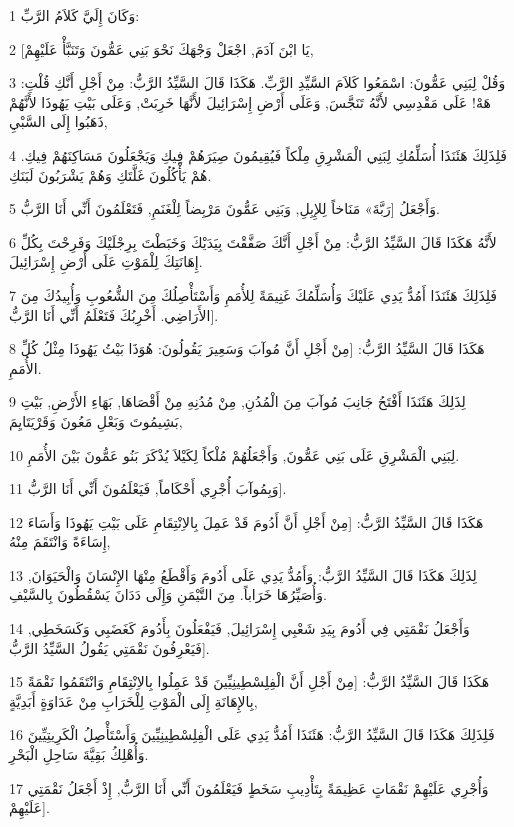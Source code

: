 \par 1 وَكَانَ إِلَيَّ كَلاَمُ الرَّبِّ:
\par 2 [يَا ابْنَ آدَمَ, اجْعَلْ وَجْهَكَ نَحْوَ بَنِي عَمُّونَ وَتَنَبَّأْ عَلَيْهِمْ,
\par 3 وَقُلْ لِبَنِي عَمُّونَ: اسْمَعُوا كَلاَمَ السَّيِّدِ الرَّبِّ. هَكَذَا قَالَ السَّيِّدُ الرَّبُّ: مِنْ أَجْلِ أَنَّكِ قُلْتِ: هَهْ! عَلَى مَقْدِسِي لأَنَّهُ تَنَجَّسَ, وَعَلَى أَرْضِ إِسْرَائِيلَ لأَنَّهَا خَرِبَتْ, وَعَلَى بَيْتِ يَهُوذَا لأَنَّهُمْ ذَهَبُوا إِلَى السَّبْيِ,
\par 4 فَلِذَلِكَ هَئَنَذَا أُسَلِّمُكِ لِبَنِي الْمَشْرِقِ مِلْكاً فَيُقِيمُونَ صِيَرَهُمْ فِيكِ وَيَجْعَلُونَ مَسَاكِنَهُمْ فِيكِ. هُمْ يَأْكُلُونَ غَلَّتَكِ وَهُمْ يَشْرَبُونَ لَبَنَكِ.
\par 5 وَأَجْعَلُ [رَبَّةَ» مَنَاخاً لِلإِبِلِ, وَبَنِي عَمُّونَ مَرْبِضاً لِلْغَنَمِ, فَتَعْلَمُونَ أَنِّي أَنَا الرَّبُّ.
\par 6 لأَنَّهُ هَكَذَا قَالَ السَّيِّدُ الرَّبُّ: مِنْ أَجْلِ أَنَّكَ صَفَّقْتَ بِيَدَيْكَ وَخَبَطْتَ بِرِجْلَيْكَ وَفَرِحْتَ بِكُلِّ إِهَانَتِكَ لِلْمَوْتِ عَلَى أَرْضِ إِسْرَائِيلَ.
\par 7 فَلِذَلِكَ هَئَنَذَا أَمُدُّ يَدِي عَلَيْكَ وَأُسَلِّمُكَ غَنِيمَةً لِلأُمَمِ وَأَسْتَأْصِلُكَ مِنَ الشُّعُوبِ وَأُبِيدُكَ مِنَ الأَرَاضِي. أَخْرِبُكَ فَتَعْلَمُ أَنِّي أَنَا الرَّبُّ].
\par 8 هَكَذَا قَالَ السَّيِّدُ الرَّبُّ: [مِنْ أَجْلِ أَنَّ مُوآبَ وَسَعِيرَ يَقُولُونَ: هُوَذَا بَيْتُ يَهُوذَا مِثْلُ كُلِّ الأُمَمِ.
\par 9 لِذَلِكَ هَئَنَذَا أَفْتَحُ جَانِبَ مُوآبَ مِنَ الْمُدُنِ, مِنْ مُدُنِهِ مِنْ أَقْصَاهَا, بَهَاءِ الأَرْضِ, بَيْتِ بَشِيمُوتَ وَبَعْلِ مَعُونَ وَقَرْيَتَايِمَ,
\par 10 لِبَنِي الْمَشْرِقِ عَلَى بَنِي عَمُّونَ, وَأَجْعَلُهُمْ مُلْكاً لِكَيْلاَ يُذْكَرَ بَنُو عَمُّونَ بَيْنَ الأُمَمِ.
\par 11 وَبِمُوآبَ أُجْرِي أَحْكَاماً, فَيَعْلَمُونَ أَنِّي أَنَا الرَّبُّ].
\par 12 هَكَذَا قَالَ السَّيِّدُ الرَّبُّ: [مِنْ أَجْلِ أَنَّ أَدُومَ قَدْ عَمِلَ بِالاِنْتِقَامِ عَلَى بَيْتِ يَهُوذَا وَأَسَاءَ إِسَاءَةً وَانْتَقَمَ مِنْهُ,
\par 13 لِذَلِكَ هَكَذَا قَالَ السَّيِّدُ الرَّبُّ: وَأَمُدُّ يَدِي عَلَى أَدُومَ وَأَقْطَعُ مِنْهَا الإِنْسَانَ وَالْحَيَوَانَ, وَأُصَيِّرُهَا خَرَاباً. مِنَ التَّيْمَنِ وَإِلَى دَدَانَ يَسْقُطُونَ بِالسَّيْفِ.
\par 14 وَأَجْعَلُ نَقْمَتِي فِي أَدُومَ بِيَدِ شَعْبِي إِسْرَائِيلَ, فَيَفْعَلُونَ بِأَدُومَ كَغَضَبِي وَكَسَخَطِي, فَيَعْرِفُونَ نَقْمَتِي يَقُولُ السَّيِّدُ الرَّبُّ].
\par 15 هَكَذَا قَالَ السَّيِّدُ الرَّبُّ: [مِنْ أَجْلِ أَنَّ الْفِلِسْطِينِيِّينَ قَدْ عَمِلُوا بِالاِنْتِقَامِ وَانْتَقَمُوا نَقْمَةً بِالإِهَانَةِ إِلَى الْمَوْتِ لِلْخَرَابِ مِنْ عَدَاوَةٍ أَبَدِيَّةٍ,
\par 16 فَلِذَلِكَ هَكَذَا قَالَ السَّيِّدُ الرَّبُّ: هَئَنَذَا أَمُدُّ يَدِي عَلَى الْفِلِسْطِينِيِّينَ وَأَسْتَأْصِلُ الْكَرِيتِيِّينَ وَأُهْلِكُ بَقِيَّةَ سَاحِلِ الْبَحْرِ.
\par 17 وَأُجْرِي عَلَيْهِمْ نَقْمَاتٍ عَظِيمَةً بِتَأْدِيبِ سَخَطٍ فَيَعْلَمُونَ أَنِّي أَنَا الرَّبُّ, إِذْ أَجْعَلُ نَقْمَتِي عَلَيْهِمْ].

